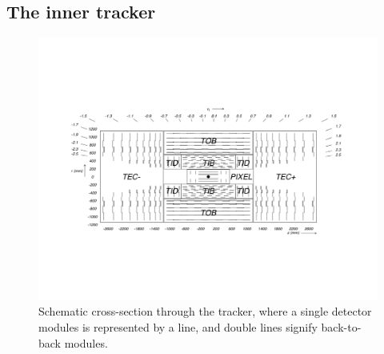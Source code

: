 \subsection{The inner tracker}
\label{subsec:tracker}

\begin{figure}
  \begin{center}
    \includegraphics[width=\textwidth]{figs/tracker_schematic.pdf}
    \caption[Schematic cross-section through the \CMS tracker, where a single detector modules is represented by a line, and double lines signify back-to-back modules.]{Schematic cross-section through the \CMS tracker, where a single detector modules is represented by a line, and double lines signify back-to-back modules.}
    \label{fig:trackerxsec}
  \end{center}
\end{figure}

